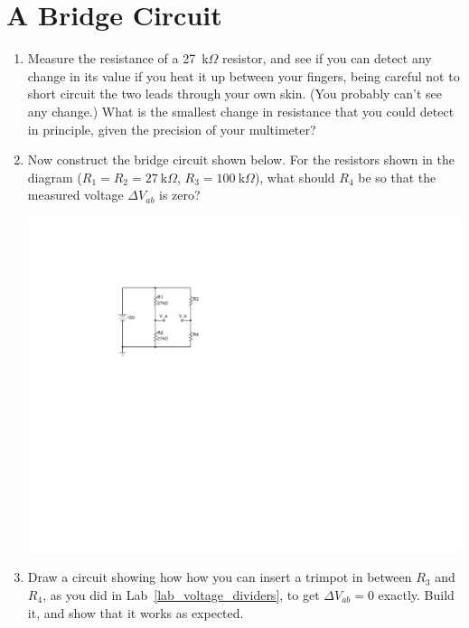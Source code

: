 \section{A Bridge Circuit}
\label{lab_bridge}


\bigskip

\begin{enumerate}[wide]

\item Measure the resistance of a 27~k$\Omega$ resistor, and see if you can detect any change in its value if you heat it up between your fingers, being careful not to short circuit the two leads through your own skin.  (You probably can't see any change.)  What is the smallest change in resistance that you could detect in principle, given the precision of your multimeter?

\item Now construct the bridge circuit shown below.  For the resistors shown in the diagram ($R_1 = R_2 = 27~$k$\Omega$, $R_3 = 100~$k$\Omega$), what should $R_4$ be so that the measured voltage $\Delta V_{ab}$ is zero?  

\begin{center}
\vspace{0.1in}
\includegraphics{bridge_circuit/bridge.pdf}
\end{center}

\item Draw a circuit showing how how you can insert a trimpot in between $R_3$ and $R_4$, as you did in Lab~\ref{lab_voltage_dividers}, to get $\Delta V_{ab} = 0$ exactly.  Build it, and show that it works as expected.
	

\end{enumerate}
